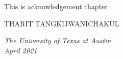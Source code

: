 This is acknowledgement chapter


\begin{flushright}
THARIT TANGKIJWANICHAKUL
\end{flushright}

\noindent \emph{The University of Texas at Austin}\\
\noindent \emph{April 2021} \\ \\

